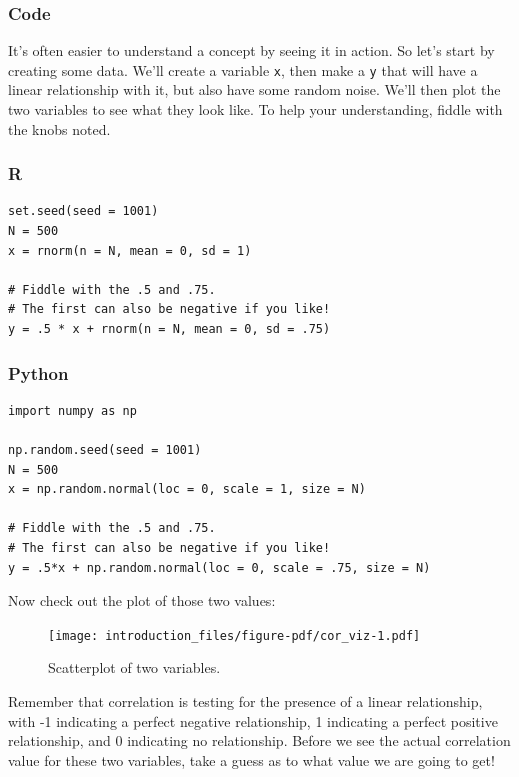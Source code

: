 \documentclass[
  letterpaper,
]{krantz}
\begin{document}
\subsubsection*{Code}\label{code}

It's often easier to understand a concept by seeing it in action. So
let's start by creating some data. We'll create a variable \texttt{x},
then make a \texttt{y} that will have a linear relationship with it, but
also have some random noise. We'll then plot the two variables to see
what they look like. To help your understanding, fiddle with the knobs
noted.

\subsubsection{R}

\begin{verbatim}
set.seed(seed = 1001)
N = 500
x = rnorm(n = N, mean = 0, sd = 1)

# Fiddle with the .5 and .75.
# The first can also be negative if you like!
y = .5 * x + rnorm(n = N, mean = 0, sd = .75)
\end{verbatim}

\subsubsection{Python}

\begin{verbatim}
import numpy as np

np.random.seed(seed = 1001)
N = 500
x = np.random.normal(loc = 0, scale = 1, size = N)

# Fiddle with the .5 and .75. 
# The first can also be negative if you like!
y = .5*x + np.random.normal(loc = 0, scale = .75, size = N) 
\end{verbatim}

Now check out the plot of those two values:

\begin{figure}[H]

{\centering \texttt{[image: introduction\_files/figure-pdf/cor\_viz-1.pdf]}

}

\caption{Scatterplot of two variables.}

\end{figure}%

Remember that correlation is testing for the presence of a linear
relationship, with -1 indicating a perfect negative relationship, 1
indicating a perfect positive relationship, and 0 indicating no
relationship. Before we see the actual correlation value for these two
variables, take a guess as to what value we are going to get!
\end{document}
